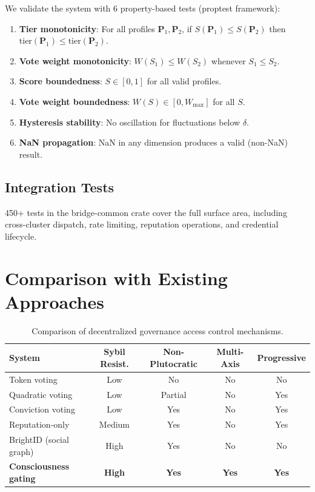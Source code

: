 \documentclass[11pt,twocolumn]{article}
\begin{document}
We validate the system with 6 property-based tests (proptest framework):

\begin{enumerate}[nosep]
  \item \textbf{Tier monotonicity}: For all profiles $\mathbf{P}_1, \mathbf{P}_2$,
    if $S(\mathbf{P}_1) \leq S(\mathbf{P}_2)$ then
    $\text{tier}(\mathbf{P}_1) \leq \text{tier}(\mathbf{P}_2)$.
  \item \textbf{Vote weight monotonicity}: $W(S_1) \leq W(S_2)$ whenever $S_1 \leq S_2$.
  \item \textbf{Score boundedness}: $S \in [0, 1]$ for all valid profiles.
  \item \textbf{Vote weight boundedness}: $W(S) \in [0, W_{\max}]$ for all $S$.
  \item \textbf{Hysteresis stability}: No oscillation for fluctuations below $\delta$.
  \item \textbf{NaN propagation}: NaN in any dimension produces a valid (non-NaN) result.
\end{enumerate}

\subsection{Integration Tests}

450+ tests in the bridge-common crate cover the full surface area, including
cross-cluster dispatch, rate limiting, reputation operations, and credential
lifecycle.

\section{Comparison with Existing Approaches}

\begin{table}[t]
\centering
\begin{tabular}{lcccc}
\toprule
\textbf{System} & \textbf{Sybil Resist.} & \textbf{Non-Plutocratic} & \textbf{Multi-Axis} & \textbf{Progressive} \\
\midrule
Token voting & Low & No & No & No \\
Quadratic voting & Low & Partial & No & Yes \\
Conviction voting & Low & Yes & No & Yes \\
Reputation-only & Medium & Yes & No & Yes \\
BrightID (social graph) & High & Yes & No & No \\
\textbf{Consciousness gating} & \textbf{High} & \textbf{Yes} & \textbf{Yes} & \textbf{Yes} \\
\bottomrule
\end{tabular}
\caption{Comparison of decentralized governance access control mechanisms.}
\label{tab:comparison}
\end{table}
\end{document}

